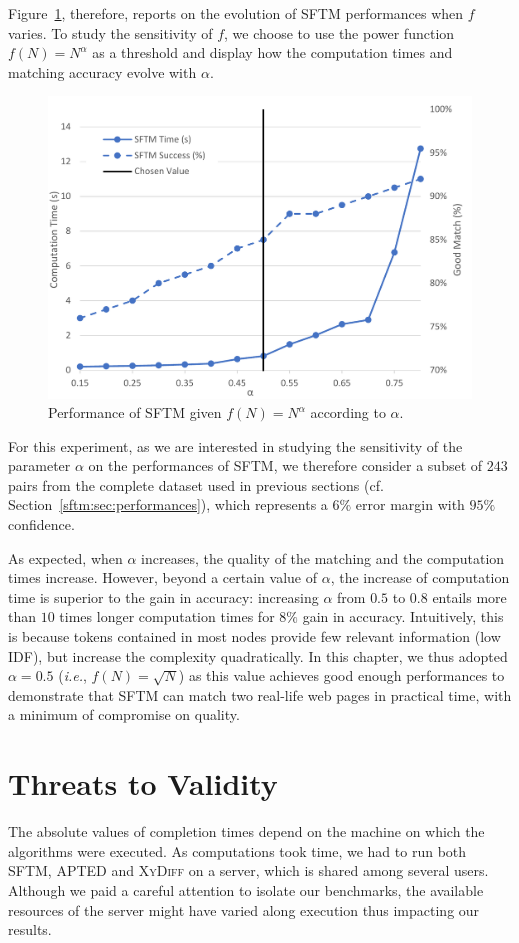 Figure~\ref{sftm:fig:parameter}, therefore, reports on the evolution of SFTM performances when $f$ varies.
To study the sensitivity of $f$, we choose to use the power function $f(N) = N^\alpha$ as a threshold and display how the computation times and matching accuracy evolve with $\alpha$.

\begin{figure}
    \centering
    \includegraphics[width=.8\linewidth]{tree-matching/graphs/sensitivity}
    \caption{Performance of SFTM given $f(N) = N^\alpha$ according to $\alpha$.}
    \label{sftm:fig:parameter}
\end{figure}

For this experiment, as we are interested in studying the sensitivity of the parameter $\alpha$ on the performances of SFTM, we therefore consider a subset of $243$ pairs from the complete dataset used in previous sections (cf. Section~\ref{sftm:sec:performances}), which represents a $6\%$ error margin with $95\%$ confidence.

As expected, when $\alpha$ increases, the quality of the matching and the computation times increase.
However, beyond a certain value of $\alpha$, the increase of computation time is superior to the gain in accuracy: increasing $\alpha$ from $0.5$ to $0.8$ entails more than $10$ times longer computation times for $8\%$ gain in accuracy. 
Intuitively, this is because tokens contained in most nodes provide few relevant information (low IDF), but increase the complexity quadratically.
In this chapter, we thus adopted $\alpha = 0.5$ (\emph{i.e.}, $f(N) = \sqrt{N}$) as this value achieves good enough performances to demonstrate that SFTM can match two real-life web pages in practical time, with a minimum of compromise on quality.  

\section{Threats to Validity}\label{sftm:sec:threats}
The absolute values of completion times depend on the machine on which the algorithms were executed.
As computations took time, we had to run both SFTM, APTED and \textsc{XyDiff} on a server, which is shared among several users.
Although we paid a careful attention to isolate our benchmarks, the available resources of the server might have varied along execution thus impacting our results.

